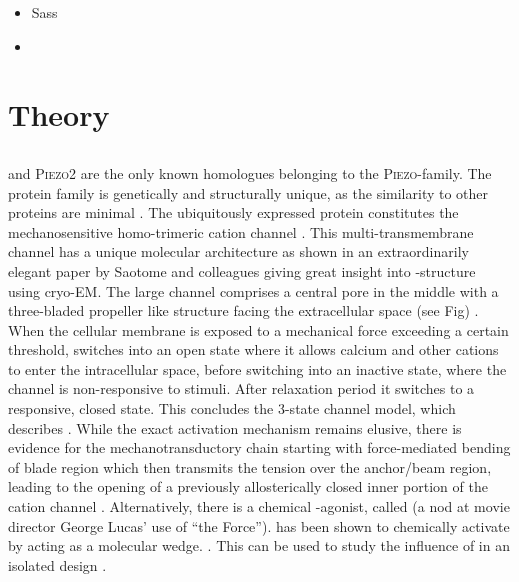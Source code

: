 \begin{itemize}
	\item Sass
	\item 
\end{itemize}


\section{Theory}

\subsection{\Piezo{}}



\Piezo{} and \textsc{Piezo2} are the only known homologues belonging to the \textsc{Piezo}-family. 
The protein family is genetically and structurally unique, as the similarity to other proteins are minimal \cite{Coste2010}. 
The ubiquitously expressed protein \Piezo{} constitutes the mechanosensitive homo-trimeric cation channel \Piezo{}. \cite{Zhao2018} This multi-transmembrane channel has a unique molecular architecture as shown in an extraordinarily elegant paper by Saotome and colleagues giving great insight into \Piezo{}-structure using cryo-EM. The large channel comprises a central pore in the middle with a three-bladed propeller like structure facing the extracellular space (see Fig) \cite{Saotome2018}. When the cellular membrane is exposed to a mechanical force exceeding a certain threshold, \Piezo{} switches into an open state where it allows calcium and other cations to enter the intracellular space, before switching into an inactive state, where the channel is non-responsive to stimuli. After relaxation period it switches to a responsive, closed state. This concludes the 3-state channel model, which describes \Piezo{}. While the exact activation mechanism remains elusive, there is evidence for the mechanotransductory chain starting with force-mediated bending of blade region which then transmits the tension over the anchor/beam region, leading to the opening of a previously allosterically closed inner portion of the cation channel \cite{Zhao2018}.
Alternatively, there is a chemical \Piezo{}-agonist, called \Yoda{} (a nod at movie director George Lucas’ use of “the Force”). \Yoda{} has been shown to chemically activate \Piezo{} by acting as a molecular wedge. \cite{Syeda2015, Lacroix2018}. This can be used to study the influence of \Piezo{} in an isolated design  \cite{Botello-Smith2019}.

